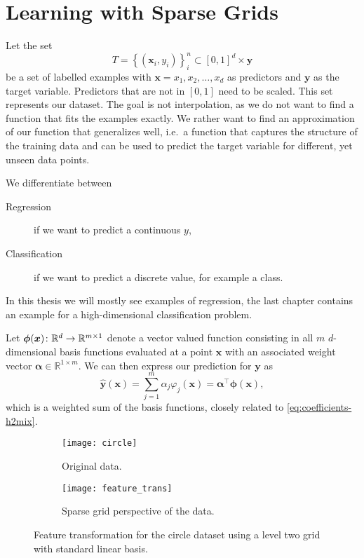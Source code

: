 \section{Learning with Sparse Grids}
Let the set
\begin{equation*}
T = \left\{ \left(  \bm{x}_i, y_i \right) \right\}_i^n \subset [0,1]^d \times \bm{y}  
\end{equation*}
be a set of labelled examples with \(\bm{x} = x_1, x_2, \ldots, x_d\) as predictors and \(\bm{y}\) as the target variable. 
Predictors that are not in \([0,1]\) need to be scaled.
This set represents our dataset.
The goal is not interpolation, as we do not want to find a function that fits the examples exactly.
We rather want to find an approximation of our function that generalizes well,
i.e.~a function that captures the structure of the training data and can be
used to predict the target variable for different, yet unseen data points.

We differentiate between
\begin{description}
\item[Regression] if we want to predict a continuous \(y\),
\item[Classification] if we want to predict a discrete value, for example a class.
\end{description}
In this thesis we will mostly see examples of regression, the last chapter contains an example for a high-dimensional classification problem.

Let \(\bm{\phi}(\bm{x}) \colon \mathbb{R}^d \to \mathbb{R}^{m \times 1}\) denote
a vector valued function consisting in all \(m\) \(d\)-dimensional basis
functions evaluated at a point \(\bm{x}\) with an associated weight vector \(\bm{\alpha} \in \mathbb{R}^{1 \times m}\).
We can then express our prediction for \(\bm{y}\) as
\begin{equation*}
\hat{\bm{y}}(\bm{x}) = \sum_{j = 1}^m \alpha_j \varphi_{j}(\bm{x}) = \boldsymbol{\alpha}^\intercal \bm{\phi} (\bm{x}),
\end{equation*}
which is a weighted sum of the basis functions, closely related to \cref{eq:coefficients-h2mix}.

\begin{figure}[htb]
  \centering
  \begin{subfigure}[b]{0.4\textwidth}
    \texttt{[image: circle]}
    \caption{Original data.}
  \end{subfigure}
  \begin{subfigure}[b]{0.4\textwidth}
    \texttt{[image: feature\_trans]}
    \caption{Sparse grid perspective of the data.}
  \end{subfigure}
  \caption{Feature transformation for the circle dataset using a level two grid
    with standard linear basis.}
  \label{fig:features}
\end{figure}

